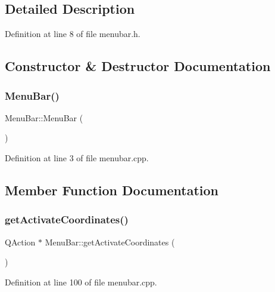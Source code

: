 \subsection{Detailed Description}


Definition at line 8 of file menubar.\+h.



\subsection{Constructor \& Destructor Documentation}
\mbox{\label{class_menu_bar_a76a0ec8b0b4cba2775fa71e1791efc6d}} 
\subsubsection{\texorpdfstring{MenuBar()}{MenuBar()}}
{\footnotesize\ttfamily Menu\+Bar\+::\+Menu\+Bar (\begin{DoxyParamCaption}{ }\end{DoxyParamCaption})}



Definition at line 3 of file menubar.\+cpp.



\subsection{Member Function Documentation}
\mbox{\label{class_menu_bar_a94443012aa7f65228a4bb3ab1b467be3}} 
\subsubsection{\texorpdfstring{getActivateCoordinates()}{getActivateCoordinates()}}
{\footnotesize\ttfamily Q\+Action $\ast$ Menu\+Bar\+::get\+Activate\+Coordinates (\begin{DoxyParamCaption}{ }\end{DoxyParamCaption})}



Definition at line 100 of file menubar.\+cpp.

\mbox{\label{class_menu_bar_ac22a4356d45b5b117a62903ee7484114}} 
